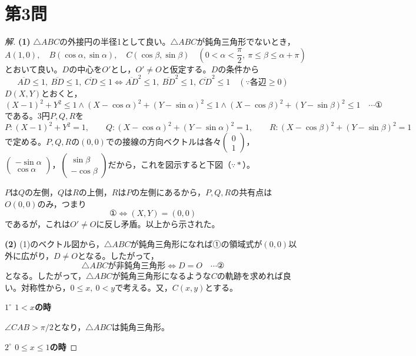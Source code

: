 \documentclass[../main.tex]{subfiles}
\begin{document}
\newpage

\section*{第3問}

\begin{proof}[解]
  \textbf{(1)} $\triangle ABC$の外接円の半径1として良い。$\triangle ABC$が鈍角三角形でないとき，
  \[
    A(1,0), \quad B(\cos\alpha,\sin\alpha), \quad C(\cos\beta,\sin\beta) \quad\left(0<\alpha<\frac{\pi}{2},\ \pi\le\beta\le\alpha+\pi\right)
  \]
  とおいて良い。$D$の中心を$O'$とし，$O'\ne O$と仮定する。$D$の条件から
  \[
    \overline{AD}\le1,\ \overline{BD}\le1,\ \overline{CD}\le1 \iff \overline{AD}^2\le1,\ \overline{BD}^2\le1,\ \overline{CD}^2\le1 \quad(\because\text{各辺}\ge0)
  \]
  $D(X,Y)$とおくと，
  \[
    (X-1)^2+Y^2\le1 \wedge (X-\cos\alpha)^2+(Y-\sin\alpha)^2\le1 \wedge (X-\cos\beta)^2+(Y-\sin\beta)^2\le1 \quad\cdots\text{①}
  \]
  である。3円$P,Q,R$を
  \[
    P: (X-1)^2+Y^2=1, \qquad Q: (X-\cos\alpha)^2+(Y-\sin\alpha)^2=1, \qquad R: (X-\cos\beta)^2+(Y-\sin\beta)^2=1
  \]
  で定める。$P,Q,R$の$(0,0)$での接線の方向ベクトルは各々$
  \begin{pmatrix}0\\1
  \end{pmatrix}$，$
  \begin{pmatrix}-\sin\alpha\\\cos\alpha
  \end{pmatrix}$，$
  \begin{pmatrix}\sin\beta\\-\cos\beta
  \end{pmatrix}$だから，これを図示すると下図（$\because *$）。

  $P$は$Q$の左側，$Q$は$R$の上側，$R$は$P$の左側にあるから，$P,Q,R$の共有点は$O(0,0)$のみ，つまり
  \[
    ①\iff(X,Y)=(0,0)
  \]
  であるが，これは$O'\ne O$に反し矛盾。以上から示された。

  \textbf{(2)} (1)のベクトル図から，$\triangle ABC$が鈍角三角形になれば①の領域式が$(0,0)$以外に広がり，$D\ne O$となる。したがって，
  \[
    \triangle ABC\text{が非鈍角三角形}\iff D=O \quad\cdots\text{②}
  \]
  となる。したがって，$\triangle ABC$が鈍角三角形になるような$C$の軌跡を求めれば良い。対称性から，$0\le x,\ 0<y$で考える。又，$C(x,y)$とする。

  \textbf{$1^\circ$ $1<x$の時}

  $\angle CAB>\pi/2$となり，$\triangle ABC$は鈍角三角形。

  \textbf{$2^\circ$ $0\le x\le1$の時}


\end{proof}
\end{document}
